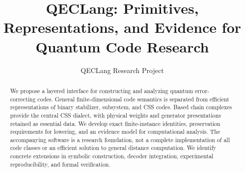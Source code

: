 \documentclass[11pt]{article}
\title{QECLang: Primitives, Representations, and Evidence for Quantum Code Research}
\author{QECLang Research Project}
\date{}
\begin{document}
\maketitle
\begin{abstract}
We propose a layered interface for constructing and analyzing quantum error-correcting codes. General finite-dimensional code semantics is separated from efficient representations of binary stabilizer, subsystem, and CSS codes. Based chain complexes provide the central CSS dialect, with physical weights and generator presentations retained as essential data. We develop exact finite-instance identities, preservation requirements for lowering, and an evidence model for computational analysis. The accompanying software is a research foundation, not a complete implementation of all code classes or an efficient solution to general distance computation. We identify concrete extensions in symbolic construction, decoder integration, experimental reproducibility, and formal verification.
\end{abstract}
\setcounter{tocdepth}{1}
\tableofcontents










\begingroup
\footnotesize
\let\originalthebibliography\thebibliography
\renewcommand{\thebibliography}[1]{\originalthebibliography{#1}\setlength{\itemsep}{0pt}}


\endgroup
\end{document}
